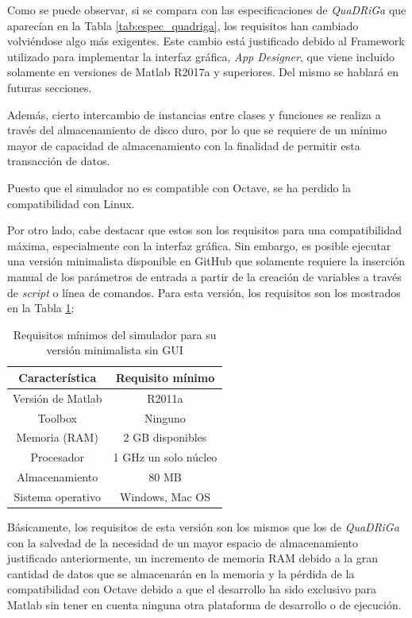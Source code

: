 Como se puede observar, si se compara con las especificaciones de \textit{QuaDRiGa} que aparecían en la Tabla \ref{tab:espec_quadriga}, los requisitos han cambiado volviéndose algo más exigentes. Este cambio está justificado debido al Framework utilizado para implementar la interfaz gráfica, \textit{App Designer}, que viene incluido solamente en versiones de Matlab R2017a y superiores. Del mismo se hablará en futuras secciones.

Además, cierto intercambio de instancias entre clases y funciones se realiza a través del almacenamiento de disco duro, por lo que se requiere de un mínimo mayor de capacidad de almacenamiento con la finalidad de permitir esta transacción de datos. 

Puesto que el simulador no es compatible con Octave, se ha perdido la compatibilidad con Linux.

Por otro lado, cabe destacar que estos son los requisitos para una compatibilidad máxima, especialmente con la interfaz gráfica. Sin embargo, es posible ejecutar una versión minimalista disponible en GitHub que solamente requiere la inserción manual de los parámetros de entrada a partir de la creación de variables a través de \textit{script} o línea de comandos. Para esta versión, los requisitos son los mostrados en la Tabla \ref{tab:espec_simulador_minimalista}:

\begin{table}[h!]
\centering
\caption{Requisitos mínimos del simulador para su versión minimalista sin GUI}
\label{tab:espec_simulador_minimalista}
\begin{tabular}{c|c}
\textbf{Característica} & \textbf{Requisito mínimo} \\ \hline
Versión de Matlab       & R2011a             \\
Toolbox                 & Ninguno                  \\
Memoria (RAM)           & 2 GB disponibles                     \\
Procesador              & 1 GHz un solo núcleo      \\
Almacenamiento          & 80 MB                     \\
Sistema operativo       & Windows, Mac OS   
\end{tabular}
\end{table}

Básicamente, los requisitos de esta versión son los mismos que los de \textit{QuaDRiGa} con la salvedad de la necesidad de un mayor espacio de almacenamiento justificado anteriormente, un incremento de memoria RAM debido a la gran cantidad de datos que se almacenarán en la memoria y la pérdida de la compatibilidad con Octave debido a que el desarrollo ha sido exclusivo para Matlab sin tener en cuenta ninguna otra plataforma de desarrollo o de ejecución.

